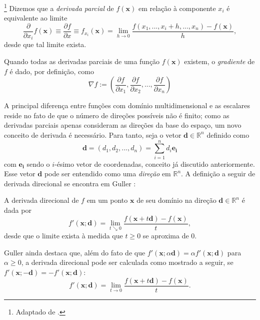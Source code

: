 \begin{definition}\footnote{Adaptado de \cite[p. 308]{thomas2}.}
Dizemos que a \textit{derivada parcial} de $f(\mathbf{x})$ em rela\c{c}\~{a}o \`{a} componente $x_i$ \'{e} equivalente ao limite
\begin{equation}
\frac{\partial}{\partial x_i}f(\mathbf{x}) \equiv \frac{\partial f}{\partial x} \equiv f_{x_i}(\mathbf{x}) = \lim_{h \to 0} \frac{f(x_1,...,x_i + h,...,x_n)-f(\mathbf{x})}{h},
\end{equation}
desde que tal limite exista.
\end{definition}

Quando todas as derivadas parciais de uma fun\c{c}\~{a}o $f(\mathbf{x})$ existem, o \textit{gradiente} de $f$ \'{e} dado, por defini\c{c}\~{a}o, como
\begin{equation}
\nabla f := (\frac{\partial f}{\partial x_1},\frac{\partial f}{\partial x_2},...,\frac{\partial f}{\partial x_n})
\end{equation}

A principal diferen\c{c}a entre fun\c{c}\~{o}es com dom\'{i}nio multidimensional e as escalares reside no fato de que o n\'{u}mero de dire\c{c}\~{o}es poss\'{i}veis n\~{a}o \'{e} finito; como as derivadas parciais apenas consideram as dire\c{c}\~{o}es da base do espa\c{c}o, um novo conceito de derivada \'{e} necess\'{a}rio. Para tanto, seja o vetor $\mathbf{d} \in \mathbb{R}^{n}$ definido como
\begin{equation*}
\mathbf{d} = (d_1,d_2,...,d_n) = \sum_{i=1}^{n} d_i\mathbf{e_i}
\end{equation*}
com $\mathbf{e_i}$ sendo o $i$-\'{e}simo vetor de coordenadas, conceito j\'{a} discutido anteriormente. Esse vetor $\mathbf{d}$ pode ser entendido como uma \textit{dire\c{c}\~{a}o} em $\mathbb{R}^{n}$. A defini\c{c}\~{a}o a seguir de derivada direcional se encontra em Guller \cite{guller}:
 
\begin{definition}\label{direcDif}
A derivada direcional de $f$ em um ponto $\mathbf{x}$ de seu dom\'{i}nio na dire\c{c}\~{a}o $\mathbf{d} \in \mathbb{R}^{n}$ \'{e} dada por
\begin{equation}
f'(\mathbf{x};\mathbf{d}) = \lim_{t \searrow 0} \frac{f(\mathbf{x}+t\mathbf{d})-f(\mathbf{x})}{t},
\end{equation}
desde que o limite exista \`{a} medida que $t \ge 0$ se aproxima de $0$.
\end{definition}

Guller ainda destaca que, al\'{e}m do fato de que $f'(\mathbf{x};\alpha\mathbf{d}) = \alpha f'(\mathbf{x};\mathbf{d})$ para $\alpha \ge 0$, a derivada direcional pode ser calculada como mostrado a seguir, se $f'(\mathbf{x};-\mathbf{d}) = -f'(\mathbf{x};\mathbf{d})$:
\begin{equation*}
f'(\mathbf{x};\mathbf{d}) = \lim_{t \to 0} \frac{f(\mathbf{x}+t\mathbf{d})-f(\mathbf{x})}{t}.
\end{equation*}

